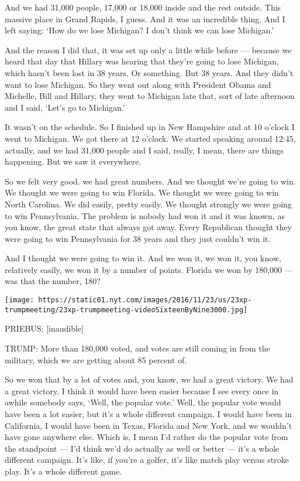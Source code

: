 And we had 31,000 people, 17,000 or 18,000 inside and the rest outside.
This massive place in Grand Rapids, I guess. And it was an incredible
thing. And I left saying: `How do we lose Michigan? I don't think we can
lose Michigan.'

And the reason I did that, it was set up only a little while before ---
because we heard that day that Hillary was hearing that they're going to
lose Michigan, which hasn't been lost in 38 years. Or something. But 38
years. And they didn't want to lose Michigan. So they went out along
with President Obama and Michelle, Bill and Hillary, they went to
Michigan late that, sort of late afternoon and I said, `Let's go to
Michigan.'

It wasn't on the schedule. So I finished up in New Hampshire and at 10
o'clock I went to Michigan. We got there at 12 o'clock. We started
speaking around 12:45, actually, and we had 31,000 people and I said,
really, I mean, there are things happening. But we saw it everywhere.

So we felt very good. we had great numbers. And we thought we're going
to win. We thought we were going to win Florida. We thought we were
going to win North Carolina. We did easily, pretty easily. We thought
strongly we were going to win Pennsylvania. The problem is nobody had
won it and it was known, as you know, the great state that always got
away. Every Republican thought they were going to win Pennsylvania for
38 years and they just couldn't win it.

And I thought we were going to win it. And we won it, we won it, you
know, relatively easily, we won it by a number of points. Florida we won
by 180,000 --- was that the number, 180?

\texttt{[image: https://static01.nyt.com/images/2016/11/23/us/23xp-trumpmeeting/23xp-trumpmeeting-videoSixteenByNine3000.jpg]}

PRIEBUS: {[}inaudible{]}

TRUMP: More than 180,000 voted, and votes are still coming in from the
military, which we are getting about 85 percent of.

So we won that by a lot of votes and, you know, we had a great victory.
We had a great victory. I think it would have been easier because I see
every once in awhile somebody says, `Well, the popular vote.' Well, the
popular vote would have been a lot easier, but it's a whole different
campaign. I would have been in California, I would have been in Texas,
Florida and New York, and we wouldn't have gone anywhere else. Which is,
I mean I'd rather do the popular vote from the standpoint --- I'd think
we'd do actually as well or better --- it's a whole different campaign.
It's like, if you're a golfer, it's like match play versus stroke play.
It's a whole different game.

